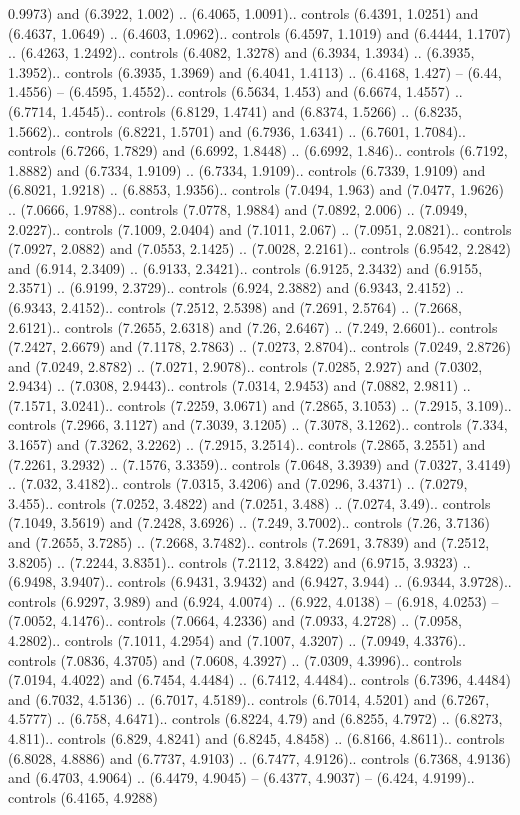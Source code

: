 0.9973) and (6.3922, 1.002) .. (6.4065, 1.0091).. controls (6.4391, 1.0251) and (6.4637, 1.0649) .. (6.4603, 1.0962).. controls (6.4597, 1.1019) and (6.4444, 1.1707) .. (6.4263, 1.2492).. controls (6.4082, 1.3278) and (6.3934, 1.3934) .. (6.3935, 1.3952).. controls (6.3935, 1.3969) and (6.4041, 1.4113) .. (6.4168, 1.427) -- (6.44, 1.4556) -- (6.4595, 1.4552).. controls (6.5634, 1.453) and (6.6674, 1.4557) .. (6.7714, 1.4545).. controls (6.8129, 1.4741) and (6.8374, 1.5266) .. (6.8235, 1.5662).. controls (6.8221, 1.5701) and (6.7936, 1.6341) .. (6.7601, 1.7084).. controls (6.7266, 1.7829) and (6.6992, 1.8448) .. (6.6992, 1.846).. controls (6.7192, 1.8882) and (6.7334, 1.9109) .. (6.7334, 1.9109).. controls (6.7339, 1.9109) and (6.8021, 1.9218) .. (6.8853, 1.9356).. controls (7.0494, 1.963) and (7.0477, 1.9626) .. (7.0666, 1.9788).. controls (7.0778, 1.9884) and (7.0892, 2.006) .. (7.0949, 2.0227).. controls (7.1009, 2.0404) and (7.1011, 2.067) .. (7.0951, 2.0821).. controls (7.0927, 2.0882) and (7.0553, 2.1425) .. (7.0028, 2.2161).. controls (6.9542, 2.2842) and (6.914, 2.3409) .. (6.9133, 2.3421).. controls (6.9125, 2.3432) and (6.9155, 2.3571) .. (6.9199, 2.3729).. controls (6.924, 2.3882) and (6.9343, 2.4152) .. (6.9343, 2.4152).. controls (7.2512, 2.5398) and (7.2691, 2.5764) .. (7.2668, 2.6121).. controls (7.2655, 2.6318) and (7.26, 2.6467) .. (7.249, 2.6601).. controls (7.2427, 2.6679) and (7.1178, 2.7863) .. (7.0273, 2.8704).. controls (7.0249, 2.8726) and (7.0249, 2.8782) .. (7.0271, 2.9078).. controls (7.0285, 2.927) and (7.0302, 2.9434) .. (7.0308, 2.9443).. controls (7.0314, 2.9453) and (7.0882, 2.9811) .. (7.1571, 3.0241).. controls (7.2259, 3.0671) and (7.2865, 3.1053) .. (7.2915, 3.109).. controls (7.2966, 3.1127) and (7.3039, 3.1205) .. (7.3078, 3.1262).. controls (7.334, 3.1657) and (7.3262, 3.2262) .. (7.2915, 3.2514).. controls (7.2865, 3.2551) and (7.2261, 3.2932) .. (7.1576, 3.3359).. controls (7.0648, 3.3939) and (7.0327, 3.4149) .. (7.032, 3.4182).. controls (7.0315, 3.4206) and (7.0296, 3.4371) .. (7.0279, 3.455).. controls (7.0252, 3.4822) and (7.0251, 3.488) .. (7.0274, 3.49).. controls (7.1049, 3.5619) and (7.2428, 3.6926) .. (7.249, 3.7002).. controls (7.26, 3.7136) and (7.2655, 3.7285) .. (7.2668, 3.7482).. controls (7.2691, 3.7839) and (7.2512, 3.8205) .. (7.2244, 3.8351).. controls (7.2112, 3.8422) and (6.9715, 3.9323) .. (6.9498, 3.9407).. controls (6.9431, 3.9432) and (6.9427, 3.944) .. (6.9344, 3.9728).. controls (6.9297, 3.989) and (6.924, 4.0074) .. (6.922, 4.0138) -- (6.918, 4.0253) -- (7.0052, 4.1476).. controls (7.0664, 4.2336) and (7.0933, 4.2728) .. (7.0958, 4.2802).. controls (7.1011, 4.2954) and (7.1007, 4.3207) .. (7.0949, 4.3376).. controls (7.0836, 4.3705) and (7.0608, 4.3927) .. (7.0309, 4.3996).. controls (7.0194, 4.4022) and (6.7454, 4.4484) .. (6.7412, 4.4484).. controls (6.7396, 4.4484) and (6.7032, 4.5136) .. (6.7017, 4.5189).. controls (6.7014, 4.5201) and (6.7267, 4.5777) .. (6.758, 4.6471).. controls (6.8224, 4.79) and (6.8255, 4.7972) .. (6.8273, 4.811).. controls (6.829, 4.8241) and (6.8245, 4.8458) .. (6.8166, 4.8611).. controls (6.8028, 4.8886) and (6.7737, 4.9103) .. (6.7477, 4.9126).. controls (6.7368, 4.9136) and (6.4703, 4.9064) .. (6.4479, 4.9045) -- (6.4377, 4.9037) -- (6.424, 4.9199).. controls (6.4165, 4.9288) 